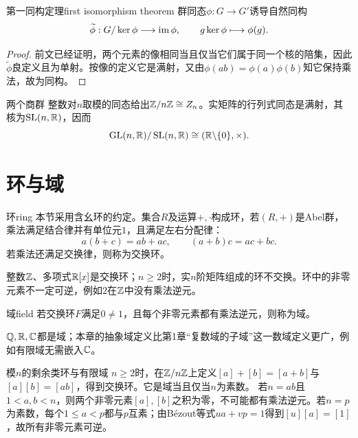 \begin{theorem}{第一同构定理}{first isomorphism theorem}
    群同态$\phi:G \to G'$诱导自然同构
    \begin{equation}\label{eq:la-first-isomorphism}
        \widetilde\phi:G/\ker\phi \longrightarrow \operatorname{im}\phi,
        \qquad g\ker\phi \longmapsto \phi(g).
    \end{equation}
\end{theorem}
\begin{proof}
    前文已经证明，两个元素的像相同当且仅当它们属于同一个核的陪集，因此$\widetilde\phi$良定义且为单射。按像的定义它是满射，又由$\phi(ab) = \phi(a)\phi(b)$知它保持乘法，故为同构。
\end{proof}
\begin{example}{两个商群}{}
    整数对$n$取模的同态给出$\mathbb{Z}/n\mathbb{Z} \cong Z_n$。实矩阵的行列式同态是满射，其核为$\operatorname{SL}(n,\mathbb{R})$，因而
    \[
        \operatorname{GL}(n,\mathbb{R})/\operatorname{SL}(n,\mathbb{R}) \cong (\mathbb{R}\backslash\{0\}, \times).
    \]
\end{example}

\section{环与域}
\begin{definition}{环}{ring}
    本节采用含幺环的约定。集合$R$及运算$+,{\cdot}$构成环，若$(R,+)$是Abel群，乘法满足结合律并有单位元$1$，且满足左右分配律：
    \begin{equation}\label{eq:la-distributive-laws}
        a(b + c) = ab + ac,\qquad(a + b)c = ac + bc.
    \end{equation}
    若乘法还满足交换律，则称为交换环。
\end{definition}
整数$\mathbb{Z}$、多项式$\mathbb{R}[x]$是交换环；$n \geq 2$时，实$n$阶矩阵组成的环不交换。环中的非零元素不一定可逆，例如$2$在$\mathbb{Z}$中没有乘法逆元。
\begin{definition}{域}{field}
    若交换环$F$满足$0 \neq 1$，且每个非零元素都有乘法逆元，则称为域。
\end{definition}
$\mathbb{Q},\mathbb{R},\mathbb{C}$都是域；本章的抽象域定义比第1章“复数域的子域”这一数域定义更广，例如有限域无需嵌入$\mathbb{C}$。
\begin{example}{模$n$的剩余类环与有限域}{}
    $n \geq 2$时，在$\mathbb{Z}/n\mathbb{Z}$上定义$[a] + [b] = [a + b]$与$[a][b] = [ab]$，得到交换环。它是域当且仅当$n$为素数。
    若$n = ab$且$1 < a,b < n$，则两个非零元素$[a],[b]$之积为零，不可能都有乘法逆元。若$n = p$为素数，每个$1 \leq a < p$都与$p$互素；由B\'ezout等式$ua + vp = 1$得到$[u][a] = [1]$，故所有非零元素可逆。
\end{example}
